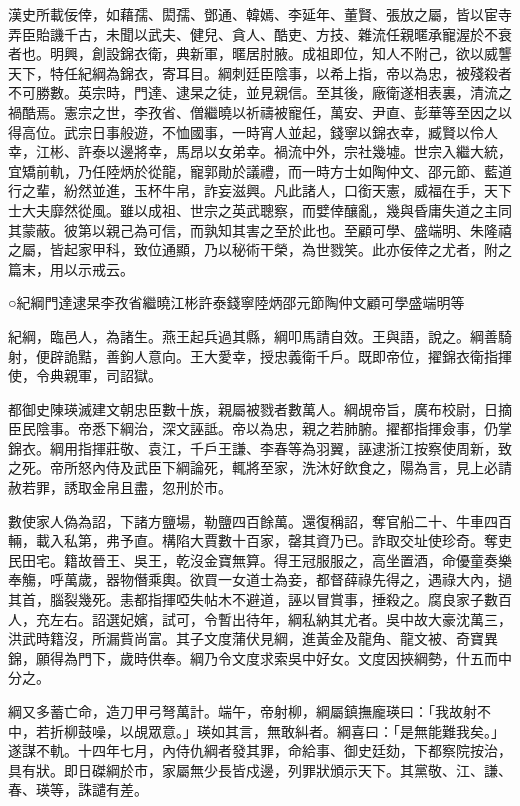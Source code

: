 
\begin{pinyinscope}
漢史所載佞倖，如藉孺、閎孺、鄧通、韓嫣、李延年、董賢、張放之屬，皆以宦寺弄臣貽譏千古，未聞以武夫、健兒、貪人、酷吏、方技、雜流任親暱承寵渥於不衰者也。明興，創設錦衣衛，典新軍，暱居肘腋。成祖即位，知人不附己，欲以威讋天下，特任紀綱為錦衣，寄耳目。綱刺廷臣陰事，以希上指，帝以為忠，被殘殺者不可勝數。英宗時，門達、逮杲之徒，並見親信。至其後，廠衛遂相表裏，清流之禍酷焉。憲宗之世，李孜省、僧繼曉以祈禱被寵任，萬安、尹直、彭華等至因之以得高位。武宗日事般遊，不恤國事，一時宵人並起，錢寧以錦衣幸，臧賢以伶人幸，江彬、許泰以邊將幸，馬昂以女弟幸。禍流中外，宗社幾墟。世宗入繼大統，宜矯前軌，乃任陸炳於從龍，寵郭勛於議禮，而一時方士如陶仲文、邵元節、藍道行之輩，紛然並進，玉杯牛帛，詐妄滋興。凡此諸人，口銜天憲，威福在手，天下士大夫靡然從風。雖以成祖、世宗之英武聰察，而嬖倖釀亂，幾與昏庸失道之主同其蒙蔽。彼第以親己為可信，而孰知其害之至於此也。至顧可學、盛端明、朱隆禧之屬，皆起家甲科，致位通顯，乃以秘術干榮，為世戮笑。此亦佞倖之尤者，附之篇末，用以示戒云。

○紀綱門達逮杲李孜省繼曉江彬許泰錢寧陸炳邵元節陶仲文顧可學盛端明等

紀綱，臨邑人，為諸生。燕王起兵過其縣，綱叩馬請自效。王與語，說之。綱善騎射，便辟詭黠，善鉤人意向。王大愛幸，授忠義衛千戶。既即帝位，擢錦衣衛指揮使，令典親軍，司詔獄。

都御史陳瑛滅建文朝忠臣數十族，親屬被戮者數萬人。綱覘帝旨，廣布校尉，日摘臣民陰事。帝悉下綱治，深文誣詆。帝以為忠，親之若肺腑。擢都指揮僉事，仍掌錦衣。綱用指揮莊敬、袁江，千戶王謙、李春等為羽翼，誣逮浙江按察使周新，致之死。帝所怒內侍及武臣下綱論死，輒將至家，洗沐好飲食之，陽為言，見上必請赦若罪，誘取金帛且盡，忽刑於市。

數使家人偽為詔，下諸方鹽場，勒鹽四百餘萬。還復稱詔，奪官船二十、牛車四百輛，載入私第，弗予直。構陷大賈數十百家，罄其資乃已。詐取交址使珍奇。奪吏民田宅。籍故晉王、吳王，乾沒金寶無算。得王冠服服之，高坐置酒，命優童奏樂奉觴，呼萬歲，器物僭乘輿。欲買一女道士為妾，都督薛祿先得之，遇祿大內，撾其首，腦裂幾死。恚都指揮啞失帖木不避道，誣以冒賞事，捶殺之。腐良家子數百人，充左右。詔選妃嬪，試可，令暫出待年，綱私納其尤者。吳中故大豪沈萬三，洪武時籍沒，所漏貲尚富。其子文度蒲伏見綱，進黃金及龍角、龍文被、奇寶異錦，願得為門下，歲時供奉。綱乃令文度求索吳中好女。文度因挾綱勢，什五而中分之。

綱又多蓄亡命，造刀甲弓弩萬計。端午，帝射柳，綱屬鎮撫龐瑛曰：「我故射不中，若折柳鼓噪，以覘眾意。」瑛如其言，無敢糾者。綱喜曰：「是無能難我矣。」遂謀不軌。十四年七月，內侍仇綱者發其罪，命給事、御史廷劾，下都察院按治，具有狀。即日磔綱於市，家屬無少長皆戍邊，列罪狀頒示天下。其黨敬、江、謙、春、瑛等，誅譴有差。


\end{pinyinscope}
